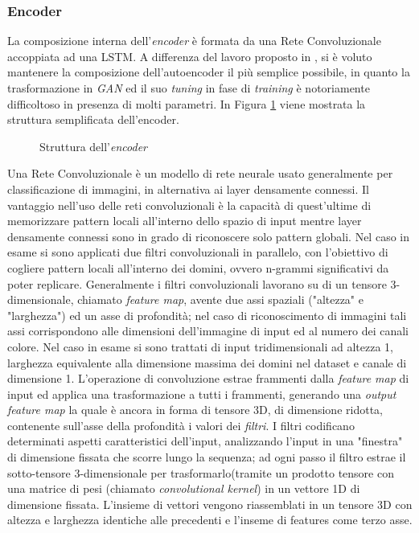 \subsubsection{Encoder}
La composizione interna dell'\textit{encoder} è formata da una Rete Convoluzionale accoppiata ad una LSTM. A differenza del lavoro proposto in \cite{deepdga}, si è voluto mantenere la composizione dell'autoencoder il più semplice possibile, in quanto la trasformazione in \textit{GAN} ed il suo \textit{tuning} in fase di \textit{training} è notoriamente difficoltoso in presenza di molti parametri. In Figura \ref{fig:encoder} viene mostrata la struttura semplificata dell'encoder.

\begin{figure}[htbp]
    \centering
	
	\caption{Struttura dell'\textit{encoder}}
\label{fig:encoder}
\end{figure}

Una Rete Convoluzionale è un modello di rete neurale usato generalmente per classificazione di immagini, in alternativa ai layer densamente connessi. Il vantaggio nell'uso delle reti convoluzionali è la capacità di quest'ultime di memorizzare pattern locali all'interno dello spazio di input mentre layer densamente connessi sono in grado di riconoscere solo pattern globali. Nel caso in esame si sono applicati due filtri convoluzionali in parallelo, con l'obiettivo di cogliere pattern locali all'interno dei domini, ovvero n-grammi significativi da poter replicare. Generalmente i filtri convoluzionali lavorano su di un tensore 3-dimensionale, chiamato \textit{feature map}, avente due assi spaziali ("altezza" e "larghezza") ed un asse di profondità; nel caso di riconoscimento di immagini tali assi corrispondono alle dimensioni dell'immagine di input ed al numero dei canali colore. Nel caso in esame si sono trattati di input tridimensionali ad altezza 1, larghezza equivalente alla dimensione massima dei domini nel dataset e canale di dimensione 1. L'operazione di convoluzione estrae frammenti dalla \textit{feature map} di input ed applica una trasformazione a tutti i frammenti, generando una \textit{output feature map} la quale è ancora in forma di tensore 3D, di dimensione ridotta, contenente sull'asse della profondità i valori dei \textit{filtri}. I filtri codificano determinati aspetti caratteristici dell'input, analizzando l'input in una "finestra" di dimensione fissata che scorre lungo la sequenza; ad ogni passo il filtro estrae il sotto-tensore 3-dimensionale per trasformarlo(tramite un prodotto tensore con una matrice di pesi (chiamato \textit{convolutional kernel}) in un vettore 1D di dimensione fissata. L'insieme di vettori vengono riassemblati in un tensore 3D con altezza e larghezza identiche alle precedenti e l'inseme di features come terzo asse.

